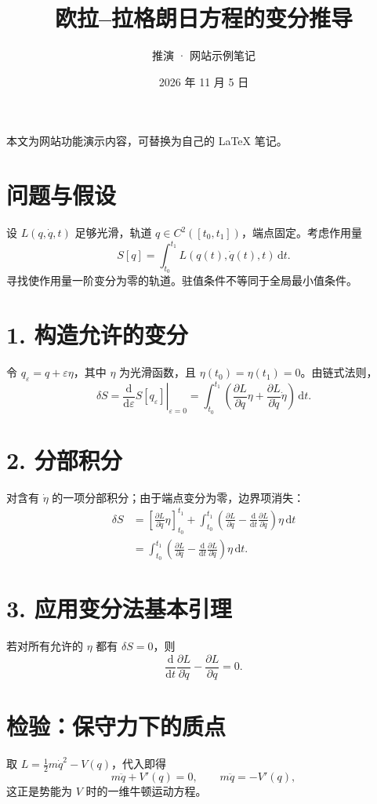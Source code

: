 \documentclass[11pt,a4paper,fontset=fandol]{ctexart}
\title{\color{forest}欧拉--拉格朗日方程的变分推导}
\author{推演 · 网站示例笔记}
\date{2026 年 11 月 5 日}
\begin{document}
\maketitle
\begin{center}\small 本文为网站功能演示内容，可替换为自己的 LaTeX 笔记。\end{center}
\section*{问题与假设}
设 $L(q,\dot q,t)$ 足够光滑，轨道 $q\in C^2([t_0,t_1])$，端点固定。考虑作用量
\[ S[q]=\int_{t_0}^{t_1}L(q(t),\dot q(t),t)\,\mathrm{d}t. \]
寻找使作用量一阶变分为零的轨道。驻值条件不等同于全局最小值条件。
\section*{1. 构造允许的变分}
令 $q_\varepsilon=q+\varepsilon\eta$，其中 $\eta$ 为光滑函数，且
$\eta(t_0)=\eta(t_1)=0$。由链式法则，
\[
\delta S=\left.\frac{\mathrm d}{\mathrm d\varepsilon}S[q_\varepsilon]\right|_{\varepsilon=0}
=\int_{t_0}^{t_1}\left(\frac{\partial L}{\partial q}\eta+
\frac{\partial L}{\partial\dot q}\dot\eta\right)\,\mathrm{d}t.
\]
\section*{2. 分部积分}
对含有 $\dot\eta$ 的一项分部积分；由于端点变分为零，边界项消失：
\begin{align*}
\delta S&=\left[\frac{\partial L}{\partial\dot q}\eta\right]_{t_0}^{t_1}
+\int_{t_0}^{t_1}\left(\frac{\partial L}{\partial q}
-\frac{\mathrm d}{\mathrm dt}\frac{\partial L}{\partial\dot q}\right)\eta\,\mathrm{d}t\\
&=\int_{t_0}^{t_1}\left(\frac{\partial L}{\partial q}
-\frac{\mathrm d}{\mathrm dt}\frac{\partial L}{\partial\dot q}\right)\eta\,\mathrm{d}t.
\end{align*}
\section*{3. 应用变分法基本引理}
若对所有允许的 $\eta$ 都有 $\delta S=0$，则
\[\boxed{\frac{\mathrm d}{\mathrm dt}\frac{\partial L}{\partial\dot q}
-\frac{\partial L}{\partial q}=0.}\]
\section*{检验：保守力下的质点}
取 $L=\tfrac12m\dot q^2-V(q)$，代入即得
\[m\ddot q+V'(q)=0,\qquad m\ddot q=-V'(q),\]
这正是势能为 $V$ 时的一维牛顿运动方程。
\end{document}
